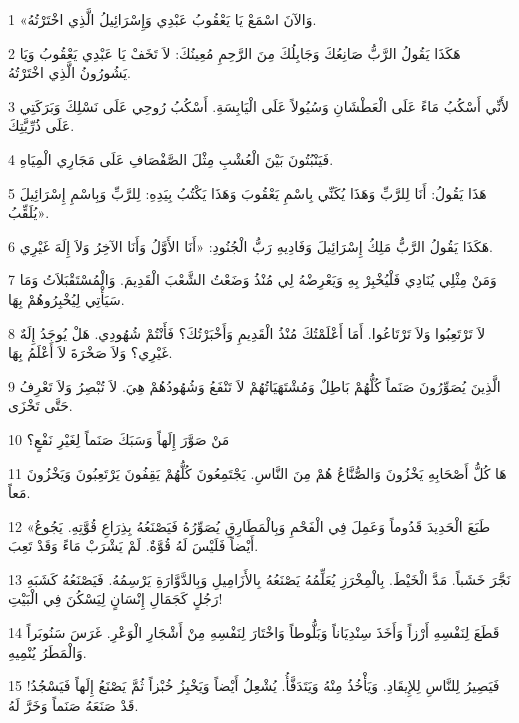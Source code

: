 \par 1 «وَالآنَ اسْمَعْ يَا يَعْقُوبُ عَبْدِي وَإِسْرَائِيلُ الَّذِي اخْتَرْتُهُ.
\par 2 هَكَذَا يَقُولُ الرَّبُّ صَانِعُكَ وَجَابِلُكَ مِنَ الرَّحِمِ مُعِينُكَ: لاَ تَخَفْ يَا عَبْدِي يَعْقُوبُ وَيَا يَشُورُونُ الَّذِي اخْتَرْتُهُ.
\par 3 لأَنِّي أَسْكُبُ مَاءً عَلَى الْعَطْشَانِ وَسُيُولاً عَلَى الْيَابِسَةِ. أَسْكُبُ رُوحِي عَلَى نَسْلِكَ وَبَرَكَتِي عَلَى ذُرِّيَّتِكَ.
\par 4 فَيَنْبُتُونَ بَيْنَ الْعُشْبِ مِثْلَ الصَّفْصَافِ عَلَى مَجَارِي الْمِيَاهِ.
\par 5 هَذَا يَقُولُ: أَنَا لِلرَّبِّ وَهَذَا يُكَنِّي بِاسْمِ يَعْقُوبَ وَهَذَا يَكْتُبُ بِيَدِهِ: لِلرَّبِّ وَبِاسْمِ إِسْرَائِيلَ يُلَقِّبُ».
\par 6 هَكَذَا يَقُولُ الرَّبُّ مَلِكُ إِسْرَائِيلَ وَفَادِيهِ رَبُّ الْجُنُودِ: «أَنَا الأَوَّلُ وَأَنَا الآخِرُ وَلاَ إِلَهَ غَيْرِي.
\par 7 وَمَنْ مِثْلِي يُنَادِي فَلْيُخْبِرْ بِهِ وَيَعْرِضْهُ لِي مُنْذُ وَضَعْتُ الشَّعْبَ الْقَدِيمَ. وَالْمُسْتَقْبَلاَتُ وَمَا سَيَأْتِي لِيُخْبِرُوهُمْ بِهَا.
\par 8 لاَ تَرْتَعِبُوا وَلاَ تَرْتَاعُوا. أَمَا أَعْلَمْتُكَ مُنْذُ الْقَدِيمِ وَأَخْبَرْتُكَ؟ فَأَنْتُمْ شُهُودِي. هَلْ يُوجَدُ إِلَهٌ غَيْرِي؟ وَلاَ صَخْرَةَ لاَ أَعْلَمُ بِهَا.
\par 9 الَّذِينَ يُصَوِّرُونَ صَنَماً كُلُّهُمْ بَاطِلٌ وَمُشْتَهَيَاتُهُمْ لاَ تَنْفَعُ وَشُهُودُهُمْ هِيَ. لاَ تُبْصِرُ وَلاَ تَعْرِفُ حَتَّى تَخْزَى.
\par 10 مَنْ صَوَّرَ إِلَهاً وَسَبَكَ صَنَماً لِغَيْرِ نَفْعٍ؟
\par 11 هَا كُلُّ أَصْحَابِهِ يَخْزُونَ وَالصُّنَّاعُ هُمْ مِنَ النَّاسِ. يَجْتَمِعُونَ كُلُّهُمْ يَقِفُونَ يَرْتَعِبُونَ وَيَخْزُونَ مَعاً.
\par 12 «طَبَعَ الْحَدِيدَ قَدُوماً وَعَمِلَ فِي الْفَحْمِ وَبِالْمَطَارِقِ يُصَوِّرُهُ فَيَصْنَعُهُ بِذِرَاعِ قُوَّتِهِ. يَجُوعُ أَيْضاً فَلَيْسَ لَهُ قُوَّةٌ. لَمْ يَشْرَبْ مَاءً وَقَدْ تَعِبَ.
\par 13 نَجَّرَ خَشَباً. مَدَّ الْخَيْطَ. بِالْمِخْرَزِ يُعَلِّمُهُ يَصْنَعُهُ بِالأَزَامِيلِ وَبِالدَّوَّارَةِ يَرْسِمُهُ. فَيَصْنَعُهُ كَشَبَهِ رَجُلٍ كَجَمَالِ إِنْسَانٍ لِيَسْكُنَ فِي الْبَيْتِ!
\par 14 قَطَعَ لِنَفْسِهِ أَرْزاً وَأَخَذَ سِنْدِيَاناً وَبَلُّوطاً وَاخْتَارَ لِنَفْسِهِ مِنْ أَشْجَارِ الْوَعْرِ. غَرَسَ سَنُوبَراً وَالْمَطَرُ يُنْمِيهِ.
\par 15 فَيَصِيرُ لِلنَّاسِ لِلإِيقَادِ. وَيَأْخُذُ مِنْهُ وَيَتَدَفَّأُ. يُشْعِلُ أَيْضاً وَيَخْبِزُ خُبْزاً ثُمَّ يَصْنَعُ إِلَهاً فَيَسْجُدُ! قَدْ صَنَعَهُ صَنَماً وَخَرَّ لَهُ.
